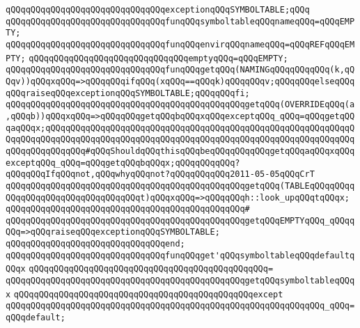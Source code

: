 \verb|qQQqqQQqqQQqqQQqqQQqqQQqqQQqqQQqexceptionqQQqSYMBOLTABLE;qQQq|\newline
\newline
\verb|qQQqqQQqqQQqqQQqqQQqqQQqqQQqqQQqfunqQQqsymboltableqQQqnameqQQq=qQQqEMPTY;|\newline
\verb|qQQqqQQqqQQqqQQqqQQqqQQqqQQqqQQqfunqQQqenvirqQQqnameqQQq=qQQqREFqQQqEMPTY;|\newline
\verb|qQQqqQQqqQQqqQQqqQQqqQQqqQQqqQQqemptyqQQq=qQQqEMPTY;|\newline
\newline
\verb|qQQqqQQqqQQqqQQqqQQqqQQqqQQqqQQqfunqQQqgetqQQq(NAMINGqQQqqQQqqQQq(k,qQQqv))qQQqxqQQq=>qQQqqQQqifqQQq(xqQQq==qQQqk)qQQqqQQqv;qQQqqQQqelseqQQqqQQqraiseqQQqexceptionqQQqSYMBOLTABLE;qQQqqQQqfi;|\newline
\verb|qQQqqQQqqQQqqQQqqQQqqQQqqQQqqQQqqQQqqQQqqQQqqQQqgetqQQq(OVERRIDEqQQq(a,qQQqb))qQQqxqQQq=>qQQqqQQqgetqQQqbqQQqxqQQqexceptqQQq_qQQq=qQQqgetqQQqaqQQqx;qQQqqQQqqQQqqQQqqQQqqQQqqQQqqQQqqQQqqQQqqQQqqQQqqQQqqQQqqQQqqQQqqQQqqQQqqQQqqQQqqQQqqQQqqQQqqQQqqQQqqQQqqQQqqQQqqQQqqQQqqQQqqQQqqQQqqQQqqQQqqQQqqQQq#qQQqShouldqQQqthisqQQqbeqQQqqQQqqQQqgetqQQqaqQQqxqQQqexceptqQQq_qQQq=qQQqgetqQQqbqQQqx;qQQqqQQqqQQq?qQQqqQQqIfqQQqnot,qQQqwhyqQQqnot?qQQqqQQqqQQq2011-05-05qQQqCrT|\newline
\verb|qQQqqQQqqQQqqQQqqQQqqQQqqQQqqQQqqQQqqQQqqQQqqQQqgetqQQq(TABLEqQQqqQQqqQQqqQQqqQQqqQQqqQQqqQQqqQQqt)qQQqxqQQq=>qQQqqQQqh::look_upqQQqtqQQqx;|\newline
\verb|qQQqqQQqqQQqqQQqqQQqqQQqqQQqqQQqqQQqqQQqqQQqqQQq#|\newline
\verb|qQQqqQQqqQQqqQQqqQQqqQQqqQQqqQQqqQQqqQQqqQQqqQQqgetqQQqEMPTYqQQq_qQQqqQQq=>qQQqraiseqQQqexceptionqQQqSYMBOLTABLE;|\newline
\verb|qQQqqQQqqQQqqQQqqQQqqQQqqQQqqQQqend;|\newline
\newline
\verb|qQQqqQQqqQQqqQQqqQQqqQQqqQQqqQQqfunqQQqget'qQQqsymboltableqQQqdefaultqQQqx|\newline
\verb|qQQqqQQqqQQqqQQqqQQqqQQqqQQqqQQqqQQqqQQqqQQqqQQq=|\newline
\verb|qQQqqQQqqQQqqQQqqQQqqQQqqQQqqQQqqQQqqQQqqQQqqQQqgetqQQqsymboltableqQQqx|\newline
\verb|qQQqqQQqqQQqqQQqqQQqqQQqqQQqqQQqqQQqqQQqqQQqqQQqexcept|\newline
\verb|qQQqqQQqqQQqqQQqqQQqqQQqqQQqqQQqqQQqqQQqqQQqqQQqqQQqqQQqqQQqqQQq_qQQq=qQQqdefault;|\newline
\newline
